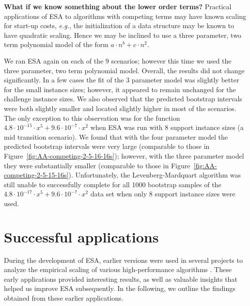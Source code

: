 \documentclass[aic]{iosart2x}
\newcommand{\eg}{\emph{e.g.}}
\begin{document}
\textbf{What if we know something about the lower order terms?}
Practical applications of ESA to algorithms with competing terms may have known scaling for start-up costs, \eg{}, the initialization of a data structure may be known to have quadratic scaling. Hence we may be inclined to use a three parameter, two term polynomial model of the form $a\cdot n^b + c\cdot n^2$. 

We ran ESA again on each of the 9 scenarios; however this time we used the three parameter, two term polynomial model. Overall, the results did not change significantly. In a few cases the fit of the 3 parameter model was slightly better for the small instance sizes; however, it appeared to remain unchanged for the challenge instance sizes. We also observed that the predicted bootstrap intervals were both slightly smaller and located slightly higher in most of the scenarios. The only exception to this observation was for the function $4.8\cdot 10^{-15} \cdot x^5 + 9.6\cdot 10^{-7} \cdot x^2$ when ESA was run with 8 support instance sizes  (a mid transition scenario). We found that with the four parameter model the predicted bootstrap intervals were very large (comparable to those in Figure~\ref{fig:AA-competing-2-5-16-16s}); however, with the three parameter model they were substantially smaller (comparable to those in Figure~\ref{fig:AA-competing-2-5-15-16s}). 
Unfortunately, the Levenberg-Mardquart algorithm was still unable to successfully complete for all 1000 bootstrap samples of the $4.8\cdot 10^{-17} \cdot x^5+ 9.6\cdot 10^{-7} \cdot x^2$ data set when only 8 support instance sizes were used. 


\section{Successful applications}
\label{sec:Successful Applications}

During the development of ESA, earlier versions were used in several projects to analyze the empirical scaling of various high-performance algorithms \cite{Mu15}. These early applications provided interesting results, as well as valuable insights that helped us improve ESA subsequently. 
In the following, we outline the findings obtained from these earlier applications.
\end{document}
